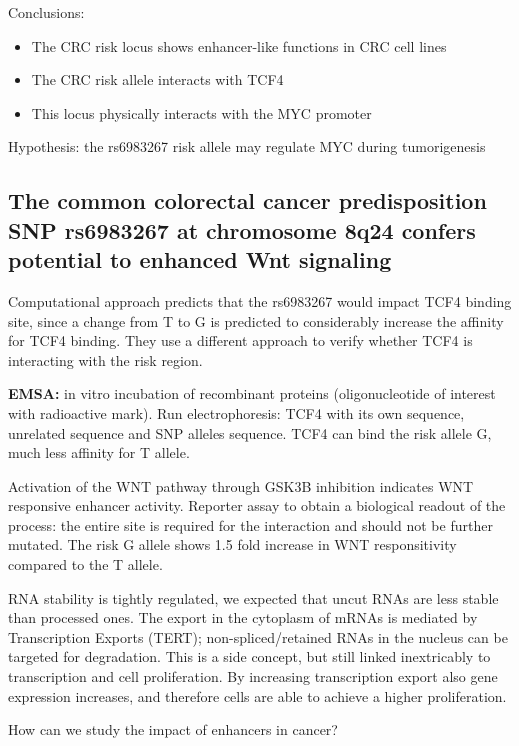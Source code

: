 Conclusions:

\begin{itemize}
\tightlist
\item
  The CRC risk locus shows enhancer-like functions in CRC cell lines
\item
  The CRC risk allele interacts with TCF4
\item
  This locus physically interacts with the MYC promoter
\end{itemize}

Hypothesis: the rs6983267 risk allele may regulate MYC during tumorigenesis

\subsection{The common colorectal cancer predisposition SNP rs6983267 at chromosome 8q24 confers potential to enhanced Wnt signaling}

Computational approach predicts that the rs6983267 would impact TCF4 binding site, since a change from T to G is predicted to considerably increase the affinity for TCF4 binding. They use a different approach to verify whether TCF4 is interacting with the risk region.

\textbf{EMSA:} in vitro incubation of recombinant proteins (oligonucleotide of interest with radioactive mark). Run electrophoresis: TCF4 with its own sequence, unrelated sequence and SNP alleles sequence. TCF4 can bind the risk allele G, much less affinity for T allele.

Activation of the WNT pathway through GSK3B inhibition indicates WNT responsive enhancer activity. Reporter assay to obtain a biological readout of the process: the entire site is required for the interaction and should not be further mutated. The risk G allele shows 1.5 fold increase in WNT responsitivity compared to the T allele.

RNA stability is tightly regulated, we expected that uncut RNAs are less stable than processed ones. The export in the cytoplasm of mRNAs is mediated by Transcription Exports (TERT); non-spliced/retained RNAs in the nucleus can be targeted for degradation. This is a side concept, but still linked inextricably to transcription and cell proliferation. By increasing transcription export also gene expression increases, and therefore cells are able to achieve a higher proliferation.

How can we study the impact of enhancers in cancer?\\

